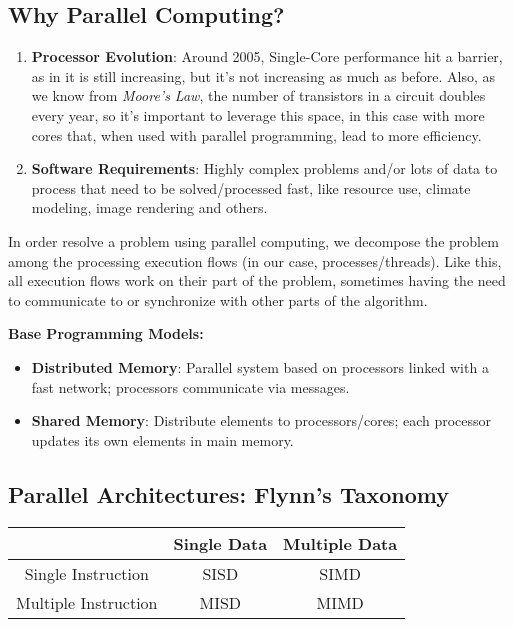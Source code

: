 \subsection{Why Parallel Computing?}
\begin{enumerate}
    \item \textbf{Processor Evolution}: Around 2005, Single-Core performance hit a barrier, as in it is still increasing, but it's not increasing as much as before. Also, as we know from \textit{Moore's Law}, the number of transistors in a circuit doubles every year, so it's important to leverage this space, in this case with more cores that, when used with parallel programming, lead to more efficiency. 
    \item \textbf{Software Requirements}: Highly complex problems and/or lots of data to process that need to be solved/processed ƒast, like resource use, climate modeling, image rendering and others. 
\end{enumerate}
\par In order resolve a problem using parallel computing, we decompose the problem among the processing execution flows (in our case, processes/threads). Like this, all execution flows work on their part of the problem, sometimes having the need to communicate to or synchronize with other parts of the algorithm.
\par \large{\textbf{Base Programming Models:}}
\begin{itemize}
    \item \textbf{Distributed Memory}: Parallel system based on processors linked with a fast network; processors communicate via messages.
    \item \textbf{Shared Memory}: Distribute elements to processors/cores; each processor updates its own elements in main memory.
\end{itemize}
\subsection{Parallel Architectures: Flynn's Taxonomy}
\begin{table}[h]
\centering
\begin{tabular}{c|cc|}
\cline{2-3}
                                           & Single Data & Multiple Data \\ \hline
\multicolumn{1}{|c|}{Single Instruction}   & SISD        & SIMD          \\
\multicolumn{1}{|c|}{Multiple Instruction} & MISD        & MIMD          \\ \hline
\end{tabular}
\end{table}
